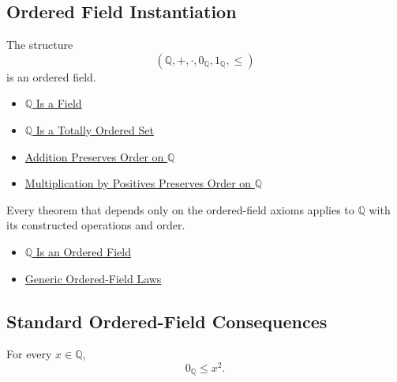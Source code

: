 \subsection*{Ordered Field Instantiation}

\begin{theorem}
\label{thm:q-is-an-ordered-field}
The structure
\[
(\mathbb{Q},+,\cdot,0_{\mathbb{Q}},1_{\mathbb{Q}},\le)
\]
is an ordered field.
\end{theorem}

\begin{dependencies}
\begin{itemize}
  \item \hyperref[thm:q-is-a-field]{$\mathbb{Q}$ Is a Field}
  \item \hyperref[thm:q-totally-ordered-set]{$\mathbb{Q}$ Is a Totally Ordered Set}
  \item \hyperref[thm:addition-preserves-order-on-q]{Addition Preserves Order on $\mathbb{Q}$}
  \item \hyperref[thm:positive-multiplication-preserves-order-on-q]{Multiplication by Positives Preserves Order on $\mathbb{Q}$}
\end{itemize}
\end{dependencies}

\begin{corollary}
\label{cor:ordered-field-laws-on-q}
Every theorem that depends only on the ordered-field axioms applies to
$\mathbb{Q}$ with its constructed operations and order.
\end{corollary}

\begin{dependencies}
\begin{itemize}
  \item \hyperref[thm:q-is-an-ordered-field]{$\mathbb{Q}$ Is an Ordered Field}
  \item \hyperref[cor:generic-ordered-field-laws]{Generic Ordered-Field Laws}
\end{itemize}
\end{dependencies}

\subsection*{Standard Ordered-Field Consequences}

\begin{corollary}
\label{cor:squares-nonnegative-on-q}
For every $x\in\mathbb{Q}$,
\[
0_{\mathbb{Q}}\le x^2.
\]
\end{corollary}

